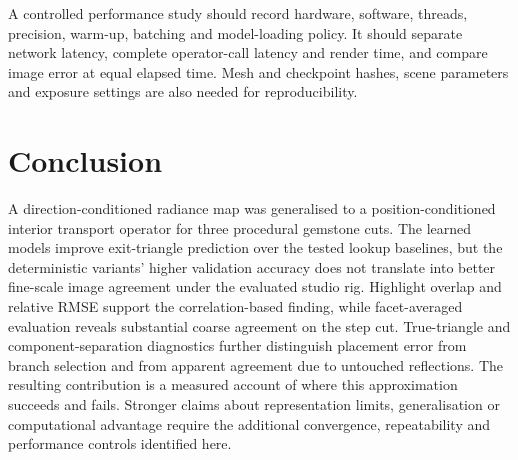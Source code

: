 \documentclass[conference]{IEEEtran}
\begin{document}
A controlled performance study should record hardware, software, threads,
precision, warm-up, batching and model-loading policy. It should separate
network latency, complete operator-call latency and render time, and compare
image error at equal elapsed time. Mesh and checkpoint hashes, scene parameters
and exposure settings are also needed for reproducibility.

\section{Conclusion}
A direction-conditioned radiance map was generalised to a position-conditioned
interior transport operator for three procedural gemstone cuts. The learned
models improve exit-triangle prediction over the tested lookup baselines, but
the deterministic variants' higher validation accuracy does not translate into
better fine-scale image agreement under the evaluated studio rig. Highlight
overlap and relative RMSE support the correlation-based finding, while
facet-averaged evaluation reveals substantial coarse agreement on the step cut.
True-triangle and component-separation diagnostics further distinguish
placement error from branch selection and from apparent agreement due to
untouched reflections. The resulting contribution is a measured account of
where this approximation succeeds and fails. Stronger claims about
representation limits, generalisation or computational advantage require the
additional convergence, repeatability and performance controls identified here.
\end{document}
